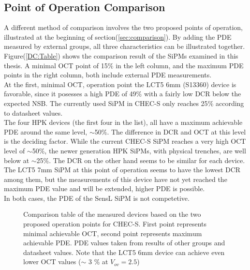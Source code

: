 \documentclass[12pt,article,type=msc,colorback,accentcolor=tud9c]{tudthesis}
\begin{document}
\subsection{Point of Operation Comparison}
\label{subsec:OP_comp}
A different method of comparison involves the two proposed points of operation, illustrated at the beginning of section(\ref{sec:comparison}). By adding the PDE measured by external groups, all three characteristics can be illustrated together. Figure(\ref{DC:Table}) shows the comparison result of the SiPMs examined in this thesis. A minimal OCT point of 15$\%$ in the left column, and the maximum PDE points in the right column, both include external PDE measurements.\\
At the first, minimal OCT, operation point the LCT5 6mm (S13360) device is favorable, since it posesses a high PDE of 49$\%$ with a fairly low DCR below the expected NSB. The currently used SiPM in CHEC-S only reaches 25$\%$ according to datasheet values.\\
The four HPK devices (the first four in the list), all have a maximum achievable PDE around the same level, $\sim$50$\%$. The difference in DCR and OCT at this level is the deciding factor. While the current CHEC-S SiPM reaches a very high OCT level of $\sim$50$\%$, the newer generation HPK SiPMs, with physical trenches, are well below at $\sim$25$\%$. The DCR on the other hand seems to be similar for each device. The LCT5 7mm SiPM at this point of operation seems to have the lowest DCR among them, but the measurements of this device have not yet reached the maximum PDE value and will be extended, higher PDE is possible.\\
In both cases, the PDE of the SensL SiPM is not competetive.  



\begin{figure}[h]
\begin{centering}
\caption[Comparison based on two proposed points of operation]{Comparison table of the measured devices based on the two proposed operation points for CHEC-S. First point represents minimal achievable OCT, second point represents maximum achievable PDE. PDE values taken from results of other groups and datasheet values. Note that the LCT5 6mm device can achieve even lower OCT values ($\sim$ 3 $\%$ at $V_{ov}=2.5$)}
\label{fig:DC_Table}
\end{centering}
\end{figure}
\end{document}
